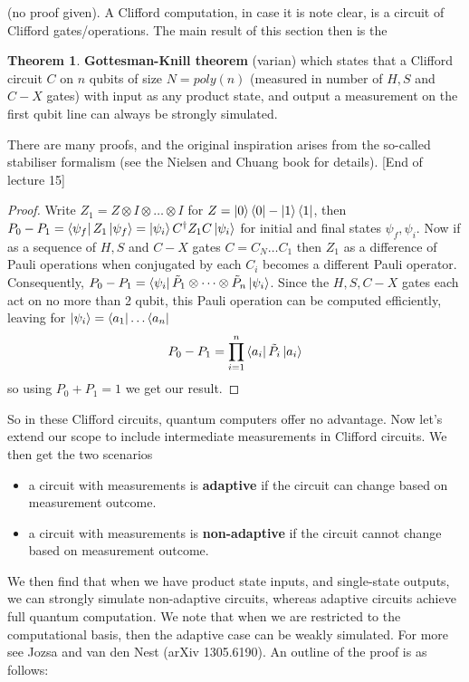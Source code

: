 \documentclass{article}
\theoremstyle{definition}
\newtheorem{theorem}{Theorem}
\begin{document}
(no proof given). A Clifford computation, in case it is note clear, is a
circuit of Clifford gates/operations. The main result of this section then is
the

\begin{theorem}
  \textbf{Gottesman-Knill theorem} (varian) which states that a Clifford circuit
  $C$ on $n$ qubits of size $N = poly(n)$ (measured in number of $H, S$ and
  $C-X$ gates) with input as any product state, and output a measurement on the
  first qubit line can always be strongly simulated.
\end{theorem}

There are many proofs, and the original inspiration arises from the so-called
stabiliser formalism (see the Nielsen and Chuang book for details). [End of
lecture 15]

\begin{proof}
  Write $Z_1 = Z \otimes I \otimes \dots \otimes I$ for $Z = \ket{0}\bra{0} -
  \ket{1}\bra{1}$, then $P_0 - P_1 = \bra{\psi_f} Z_1 \ket{\psi_f} =
  \ket{\psi_i} C^\dagger Z_1 C \ket{\psi_i}$ for initial and final states
  $\psi_f, \psi_i$. Now if as a sequence of $H, S$ and $C-X$ gates $C = C_N
  \dots C_1$ then $Z_1$ as a difference of Pauli operations when conjugated by
  each $C_i$ becomes a different Pauli operator. Consequently, $P_0 - P_1 =
  \bra{\psi_i} \tilde{P}_1 \otimes \dots \otimes \tilde{P}_n \ket{\psi_i}$.
  Since the $H, S, C-X$ gates each act on no more than 2 qubit, this Pauli
  operation can be computed efficiently, leaving for $\ket{\psi_i} = \bra{a_1}
  \dots \bra{a_n}$
  $$ P_0 - P_1 = \prod_{i = 1}^n \bra{a_i} \tilde{P}_i \ket{a_i} $$
  so using $P_0 + P_1 = 1$ we get our result.
\end{proof}

So in these Clifford circuits, quantum computers offer no advantage. Now let's
extend our scope to include intermediate measurements in Clifford circuits. We
then get the two scenarios

\begin{itemize}
\item a circuit with measurements is \textbf{adaptive} if the circuit can
  change based on measurement outcome.
\item a circuit with measurements is \textbf{non-adaptive} if the circuit cannot
  change based on measurement outcome.
\end{itemize}

We then find that when we have product state inputs, and single-state outputs,
we can strongly simulate non-adaptive circuits, whereas adaptive circuits
achieve full quantum computation. We note that when we are restricted to the
computational basis, then the adaptive case can be weakly simulated. For more
see Jozsa and van den Nest (arXiv 1305.6190). An outline of the proof is as
follows:
\end{document}
